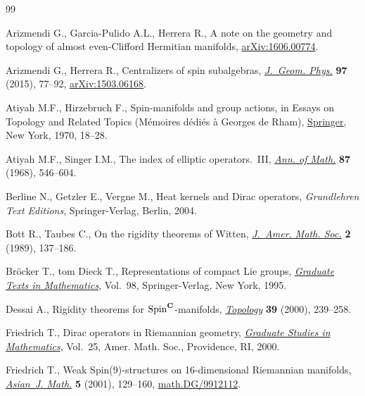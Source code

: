 \begin{thebibliography}{99}
\footnotesize\itemsep=0pt

Arizmendi G., Garcia-Pulido A.L., Herrera R., A note on the geometry and
 topology of almost even-{C}lif\/ford {H}ermitian manifolds,
 \href{http://arxiv.org/abs/1606.00774}{arXiv:1606.00774}.

Arizmendi G., Herrera R., Centralizers of spin subalgebras, \href{https://doi.org/10.1016/j.geomphys.2015.07.002}{\textit{J.~Geom.
 Phys.}} \textbf{97} (2015), 77--92, \href{http://arxiv.org/abs/1503.06168}{arXiv:1503.06168}.

Atiyah M.F., Hirzebruch F., Spin-manifolds and group actions, in Essays on
 {T}opology and {R}elated {T}opics ({M}\'emoires d\'edi\'es \`a {G}eorges de
 {R}ham), \href{https://doi.org/10.1007/978-3-642-49197-9_3}{Springer}, New York, 1970, 18--28.

Atiyah M.F., Singer I.M., The index of elliptic operators.~{III}, \href{https://doi.org/10.2307/1970717}{\textit{Ann.
 of Math.}} \textbf{87} (1968), 546--604.

Berline N., Getzler E., Vergne M., Heat kernels and {D}irac operators,
 \textit{Grundlehren Text Editions}, Springer-Verlag, Berlin, 2004.

Bott R., Taubes C., On the rigidity theorems of {W}itten, \href{https://doi.org/10.2307/1990915}{\textit{J.~Amer.
 Math. Soc.}} \textbf{2} (1989), 137--186.

Br\"ocker T., tom Dieck T., Representations of compact {L}ie groups,
 \href{https://doi.org/10.1007/978-3-662-12918-0}{\textit{Graduate Texts in Mathematics}}, Vol.~98, Springer-Verlag, New York,
 1995.

Dessai A., Rigidity theorems for {${\rm Spin}^{\bf C}$}-manifolds,
 \href{https://doi.org/10.1016/S0040-9383(99)00005-1}{\textit{Topology}} \textbf{39} (2000), 239--258.

Friedrich T., Dirac operators in {R}iemannian geometry, \href{https://doi.org/10.1090/gsm/025}{\textit{Graduate
 Studies in Mathematics}}, Vol.~25, Amer. Math. Soc., Providence,
 RI, 2000.

Friedrich T., Weak {S}pin(9)-structures on 16-dimensional {R}iemannian
 manifolds, \href{https://doi.org/10.4310/AJM.2001.v5.n1.a9}{\textit{Asian~J. Math.}} \textbf{5} (2001), 129--160,
 \href{http://arxiv.org/abs/math.DG/9912112}{math.DG/9912112}.


\end{thebibliography}
